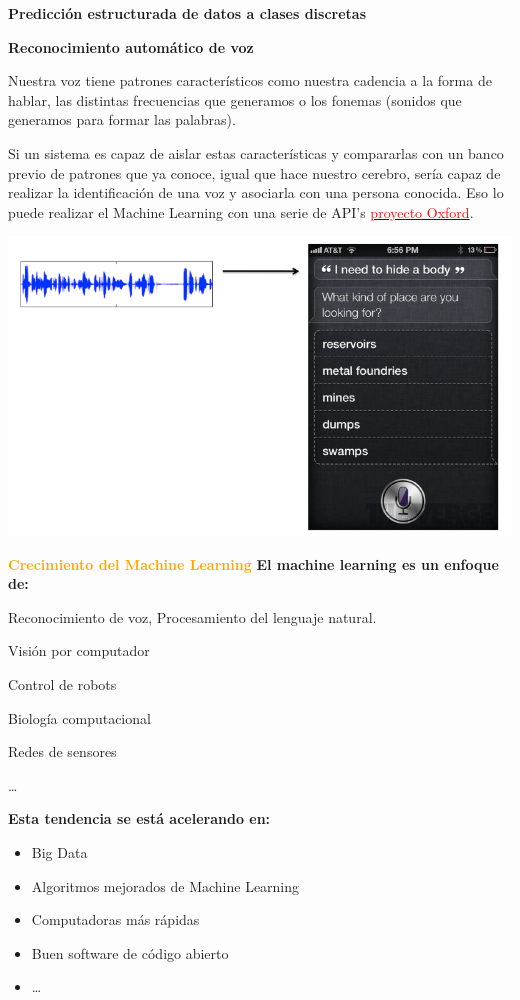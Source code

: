\documentclass[11pt]{beamer}
\begin{document}
\begin{frame}{\textbf{\textcolor{green!55!red}{Predicci\'on estructurada de datos a clases discretas}}}
	
\textbf{Reconocimiento autom\'atico de voz}
	
\scriptsize{Nuestra voz tiene patrones caracter\'isticos como nuestra cadencia a la forma de hablar, las distintas frecuencias que generamos o los fonemas (sonidos que generamos para formar las palabras). 
		
Si un sistema es capaz de aislar estas caracter\'isticas y compararlas con un banco previo de patrones que ya conoce, igual que hace nuestro cerebro, ser\'ia capaz de realizar la identificaci\'on de una voz y asociarla con una persona conocida.  Eso lo puede realizar el Machine Learning con una serie de API's  \href{https://blogs.technet.microsoft.com/machinelearning/2015/12/14/now-available-speaker-video-apis-from-microsoft-project-oxford/}{\textcolor{red}{proyecto Oxford}}.}
	
	\begin{center}
		\includegraphics[width=0.55 \textwidth]{ML16.png}	
	\end{center}
\end{frame}


\begin{frame}{\textbf{\textcolor{orange}{Crecimiento del Machine Learning}}}
	\textbf{El machine learning es un enfoque de:}
	\begin{itemize}
		\small{
			\item Reconocimiento de voz, Procesamiento del lenguaje natural.
			\item  Visi\'on por computador
			\item Control de robots
			\item Biolog\'ia computacional
			\item Redes de sensores
			\item \dots
		}
	\end{itemize}
	
	\textbf{Esta tendencia se est\'a acelerando en:}
	\small{
		\begin{itemize}
			\item Big Data
			\item Algoritmos mejorados de Machine Learning
			\item Computadoras m\'as r\'apidas
			\item Buen software de c\'odigo abierto
			\item \dots
		\end{itemize}
	}
\end{frame}
\end{document}

